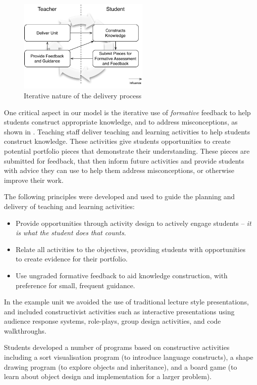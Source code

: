 \begin{figure}[t!]
	\centering
	\includegraphics[width=2.5in]{DeliveryProcess}
	\caption{Iterative nature of the delivery process}
	\label{fig:delivery_overview}
\end{figure}

One critical aspect in our model is the iterative use of \emph{formative} feedback to help students construct appropriate knowledge, and to address misconceptions, as shown in . Teaching staff deliver teaching and learning activities to help students construct knowledge. These activities give students opportunities to create potential portfolio pieces that demonstrate their understanding. These pieces are submitted for feedback, that then inform future activities and provide students with advice they can use to help them address misconceptions, or otherwise improve their work.

The following principles were developed and used to guide the planning and delivery of teaching and learning activities:

\begin{itemize}
  \item Provide opportunities through activity design to actively engage students -- \emph{it is what the student does that counts}.  
  \item Relate all activities to the objectives, providing students with opportunities to create evidence for their portfolio.
  \item Use ungraded formative feedback to aid knowledge construction, with preference for small, frequent guidance.
\end{itemize}

In the example unit we avoided the use of traditional lecture style presentations, and included constructivist activities such as interactive presentations using audience response systems, role-plays, group design activities, and code walkthroughs. 

Students developed a number of programs based on constructive activities including a sort visualisation program (to introduce language constructs), a shape drawing program (to explore objects and inheritance), and a board game (to learn about object design and implementation for a larger problem).

